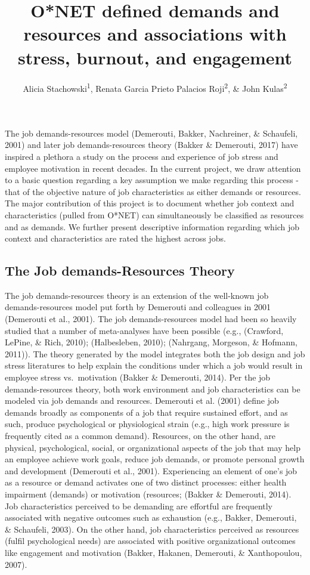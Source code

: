 \documentclass[
  english,
  man]{apa6}
\title{O*NET defined demands and resources and associations with stress, burnout, and engagement}
\author{Alicia Stachowski\textsuperscript{1}, Renata Garcia Prieto Palacios Roji\textsuperscript{2}, \& John Kulas\textsuperscript{2}}
\date{}
\affiliation{\vspace{0.5cm}\textsuperscript{1} University of Wisconsin - Stout\\\textsuperscript{2} Montclair State University}
\begin{document}
\maketitle

The job demands-resources model (Demerouti, Bakker, Nachreiner, \& Schaufeli, 2001) and later job demands-resources theory (Bakker \& Demerouti, 2017) have inspired a plethora a study on the process and experience of job stress and employee motivation in recent decades. In the current project, we draw attention to a basic question regarding a key assumption we make regarding this process - that of the objective nature of job characteristics as either demands or resources. The major contribution of this project is to document whether job context and characteristics (pulled from O*NET) can simultaneously be classified as resources and as demands. We further present descriptive information regarding which job context and characteristics are rated the highest across jobs.

\hypertarget{the-job-demands-resources-theory}{%
\subsection{The Job demands-Resources Theory}\label{the-job-demands-resources-theory}}

The job demands-resources theory is an extension of the well-known job demands-resources model put forth by Demerouti and colleagues in 2001 (Demerouti et al., 2001). The job demands-resources model had been so heavily studied that a number of meta-analyses have been possible (e.g., (Crawford, LePine, \& Rich, 2010);
(Halbesleben, 2010); (Nahrgang, Morgeson, \& Hofmann, 2011)). The theory generated by the model integrates both the job design and job stress literatures to help explain the conditions under which a job would result in employee stress vs.~motivation (Bakker \& Demerouti, 2014). Per the job demands-resources theory, both work environment and job characteristics can be modeled via job demands and resources. Demerouti et al. (2001) define job demands broadly as components of a job that require sustained effort, and as such, produce psychological or physiological strain (e.g., high work pressure is frequently cited as a common demand). Resources, on the other hand, are physical, psychological, social, or organizational aspects of the job that may help an employee achieve work goals, reduce job demands, or promote personal growth and development (Demerouti et al., 2001).
Experiencing an element of one's job as a resource or demand activates one of two distinct processes: either health impairment (demands) or motivation (resources; (Bakker \& Demerouti, 2014). Job characteristics perceived to be demanding are effortful are frequently associated with negative outcomes such as exhaustion (e.g., Bakker, Demerouti, \& Schaufeli, 2003). On the other hand, job characteristics perceived as resources (fulfil psychological needs) are associated with positive organizational outcomes like engagement and motivation (Bakker, Hakanen, Demerouti, \& Xanthopoulou, 2007).
\end{document}
